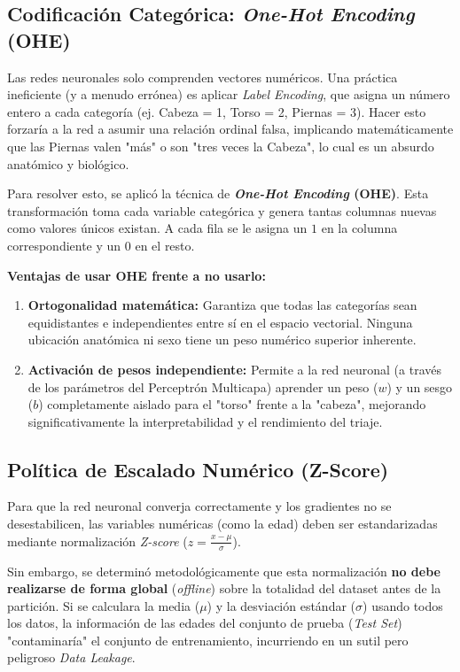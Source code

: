 \subsection{Codificación Categórica: \textit{One-Hot Encoding} (OHE)}
Las redes neuronales solo comprenden vectores numéricos. Una práctica ineficiente (y a menudo errónea) es aplicar \textit{Label Encoding}, que asigna un número entero a cada categoría (ej. Cabeza = 1, Torso = 2, Piernas = 3). Hacer esto forzaría a la red a asumir una relación ordinal falsa, implicando matemáticamente que las Piernas valen "más" o son "tres veces la Cabeza", lo cual es un absurdo anatómico y biológico.

Para resolver esto, se aplicó la técnica de \textbf{\textit{One-Hot Encoding} (OHE)}. Esta transformación toma cada variable categórica y genera tantas columnas nuevas como valores únicos existan. A cada fila se le asigna un $1$ en la columna correspondiente y un $0$ en el resto. 

\textbf{Ventajas de usar OHE frente a no usarlo:}
\begin{enumerate}
	\item \textbf{Ortogonalidad matemática:} Garantiza que todas las categorías sean equidistantes e independientes entre sí en el espacio vectorial. Ninguna ubicación anatómica ni sexo tiene un peso numérico superior inherente.
	\item \textbf{Activación de pesos independiente:} Permite a la red neuronal (a través de los parámetros del Perceptrón Multicapa) aprender un peso ($w$) y un sesgo ($b$) completamente aislado para el "torso" frente a la "cabeza", mejorando significativamente la interpretabilidad y el rendimiento del triaje.
\end{enumerate}

\subsection{Política de Escalado Numérico (Z-Score)}
Para que la red neuronal converja correctamente y los gradientes no se desestabilicen, las variables numéricas (como la edad) deben ser estandarizadas mediante normalización \textit{Z-score} ($z = \frac{x - \mu}{\sigma}$).

Sin embargo, se determinó metodológicamente que esta normalización \textbf{no debe realizarse de forma global} (\textit{offline}) sobre la totalidad del dataset antes de la partición. Si se calculara la media ($\mu$) y la desviación estándar ($\sigma$) usando todos los datos, la información de las edades del conjunto de prueba (\textit{Test Set}) "contaminaría" el conjunto de entrenamiento, incurriendo en un sutil pero peligroso \textit{Data Leakage}. 

